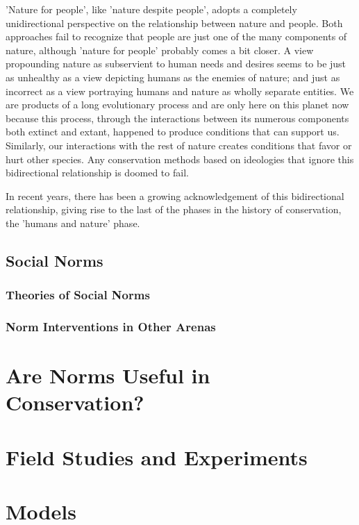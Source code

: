 \documentclass[rutwik_proposal.tex]{subfiles}
\begin{document}
'Nature for people', like 'nature despite people', adopts a completely unidirectional perspective on the relationship between nature and people. Both approaches fail to recognize that people are just one of the many components of nature, although 'nature for people' probably comes a bit closer. A view propounding nature as subservient to human needs and desires seems to be just as unhealthy as a view depicting humans as the enemies of nature; and just as incorrect as a view portraying humans and nature as wholly separate entities. We are products of a long evolutionary process and are only here on this planet now because this process, through the interactions between its numerous components both extinct and extant, happened to produce conditions that can support us. Similarly, our interactions with the rest of nature creates conditions that favor or hurt other species. Any conservation methods based on ideologies that ignore this bidirectional relationship is doomed to fail.

In recent years, there has been a growing acknowledgement of this bidirectional relationship, giving rise to the last of the phases in the history of conservation, the 'humans and nature' phase.

\section{Social Norms}\label{sec:norms}
\subsection{Theories of Social Norms}\label{subsec:theories}
\subsection{Norm Interventions in Other Arenas}\label{subsec:interventions}

\chapter{Are Norms Useful in Conservation?}\label{ch:usefulness}

\chapter{Field Studies and Experiments}\label{ch:field}

\chapter{Models}\label{ch:models}
\end{document}
